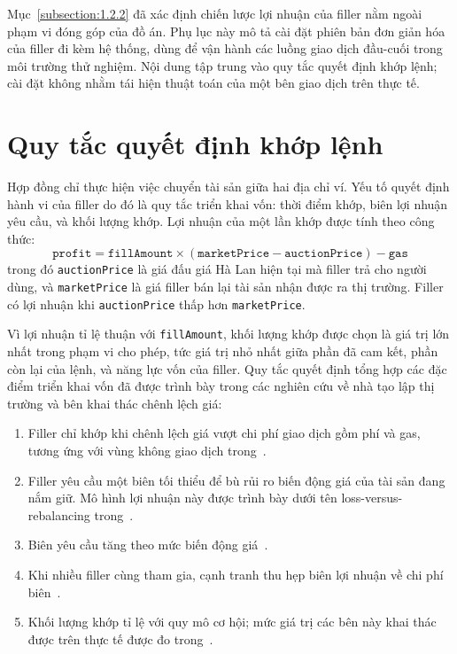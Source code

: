 \documentclass[../DoAn.tex]{subfiles}
\begin{document}
Mục~\ref{subsection:1.2.2} đã xác định chiến lược lợi nhuận của filler nằm ngoài phạm vi đóng góp của đồ án. Phụ lục này mô tả cài đặt phiên bản đơn giản hóa của filler đi kèm hệ thống, dùng để vận hành các luồng giao dịch đầu-cuối trong môi trường thử nghiệm. Nội dung tập trung vào quy tắc quyết định khớp lệnh; cài đặt không nhằm tái hiện thuật toán của một bên giao dịch trên thực tế.

\section{Quy tắc quyết định khớp lệnh}

Hợp đồng chỉ thực hiện việc chuyển tài sản giữa hai địa chỉ ví. Yếu tố quyết định hành vi của filler do đó là quy tắc triển khai vốn: thời điểm khớp, biên lợi nhuận yêu cầu, và khối lượng khớp. Lợi nhuận của một lần khớp được tính theo công thức:
\begin{equation}
    \texttt{profit} = \texttt{fillAmount} \times (\texttt{marketPrice} - \texttt{auctionPrice}) - \texttt{gas}
    \label{eq:filler-profit}
\end{equation}
trong đó \texttt{auctionPrice} là giá đấu giá Hà Lan hiện tại mà filler trả cho người dùng, và \texttt{marketPrice} là giá filler bán lại tài sản nhận được ra thị trường. Filler có lợi nhuận khi \texttt{auctionPrice} thấp hơn \texttt{marketPrice}.

Vì lợi nhuận tỉ lệ thuận với \texttt{fillAmount}, khối lượng khớp được chọn là giá trị lớn nhất trong phạm vi cho phép, tức giá trị nhỏ nhất giữa phần đã cam kết, phần còn lại của lệnh, và năng lực vốn của filler. Quy tắc quyết định tổng hợp các đặc điểm triển khai vốn đã được trình bày trong các nghiên cứu về nhà tạo lập thị trường và bên khai thác chênh lệch giá:

\begin{enumerate}
    \item Filler chỉ khớp khi chênh lệch giá vượt chi phí giao dịch gồm phí và gas, tương ứng với vùng không giao dịch trong~\cite{milionis2023fees}.
    \item Filler yêu cầu một biên tối thiểu để bù rủi ro biến động giá của tài sản đang nắm giữ. Mô hình lợi nhuận này được trình bày dưới tên loss-versus-rebalancing trong~\cite{milionis2022lvr}.
    \item Biên yêu cầu tăng theo mức biến động giá~\cite{milionis2022lvr}.
    \item Khi nhiều filler cùng tham gia, cạnh tranh thu hẹp biên lợi nhuận về chi phí biên~\cite{daian2020flashboys}.
    \item Khối lượng khớp tỉ lệ với quy mô cơ hội; mức giá trị các bên này khai thác được trên thực tế được đo trong~\cite{qin2022quantifying}.
\end{enumerate}
\end{document}
